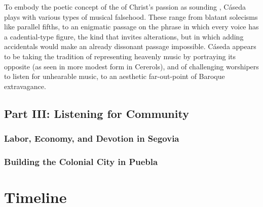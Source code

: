 \documentclass[tt]{vcbook-proposal}
\begin{document}
To embody the poetic concept of the  of Christ's passion as sounding , Cáseda plays with various types of musical falsehood.
These range from blatant solecisms like parallel fifths, to an enigmatic passage on the phrase  in which every voice has a cadential-type figure, the kind that invites  alterations, but in which adding accidentals would make an already dissonant passage impossible.
Cáseda appears to be taking the tradition of representing heavenly music by portraying its opposite (as seen in more modest form in Cererols), and of challenging worshipers to listen for unhearable music, to an aesthetic far-out-point of Baroque extravagance.



\subsection{Part III: Listening for Community}

\subsubsection{Labor, Economy, and Devotion in Segovia}



\subsubsection{Building the Colonial City in Puebla}

\section{Timeline}

\printbibliography
\end{document}
